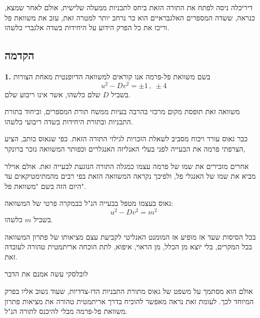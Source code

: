 דיריכלה ניסה לפתח את התורה הזאת ביחס לתבניות ממעלה שלישית, אולם לאחר שמצא, כנראה, ששדה המספרים האלגבראיים הוא כר נרחב יותר למטרה זאת, עזב את משוואת פל וריכז את כל הפרק הידוע על היחידות בשדה אלגברי כלשהו.

\subsection*{הקדמה}

\noindent\textbf{1.} בשם משוואת פל-פרמה אנו קוראים למשוואה הדיופנטית מאחת הצורות
\[ u^2 - Dv^2 = \pm 1 \, , \; \pm 4 \]
בשביל $D$ שלם כלשהו, אשר אינו ריבוע שלם.

משוואה זאת תופסת מקום מרכזי בהרבה בעיות ממשח תורת המספרים, וביחוד בתורת התבניות ובתורת היחידות בשדה ריבועי כלשהו.

כבר גאוס עורר ויכוח מסביב לשאלת הזכויות לגילוי התורה הזאת. כפי שגאוס כותב, הציע הצרפתי פרמה את הבעייה לפני בעלי האנליזה האנגלרים וכפותר המשוואה נזכר ברונקר,

\medskip
\noindent{}

\medskip
אחרים מזכירים את שמו של פרמה עצמו כמגלה התורה הנוגעת לבעייה זאת. אולם אוילר מביא את שמו של האנגלי פל, ולפיכך נקראה המשוואה הזאת בפי רבים מהמתימטיקאים עד היום הזה בשם "משוואת פל".

\medskip
\noindent{}

\noindent{}

\noindent{}

\noindent{}

\medskip
גאוס בעצמו מטפל בבעייה הנ"ל כבמקרה פרטי של המשוואה:
\[ u^2 - Dv^2 = m^2 \]
בשביל $m$ כלשהו.

\medskip
\noindent{}

\medskip
בכל הסיסות שעד אז מופיע אז המומנט האנליטי לקביעת עצם מציאותו של פתרון המשוואה בכל המקרים, בלי יוצא מן הכלל, מן הראוי, איפוא, לתת הוכחה אריתמטית טהורה לעובדה זאת.

לובלסקי עשה אמנם את הדבר

\noindent{}

\noindent{}

\medskip
אולם הוא מסתמך על משפט של גאוס מתורת התבניות הדו-צדדיות, שעוד נשוב אליו בפרק המיוחד לכך. לעומת זאת נראה מאפשר להוכיח בדרך אריתמטית טהורה את מציאות פתרון משוואת פל-פרמה מבלי להיכנס לתורה הנ"ל.

